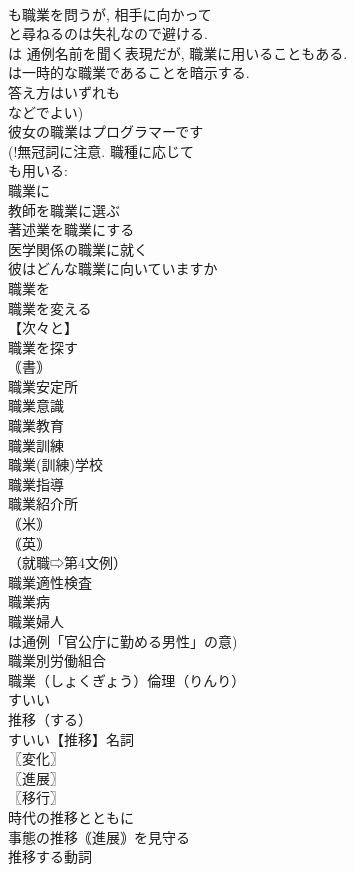 \documentclass[8pt]{extreport}
\begin{document}
\begin{CJK}{UTF8}{min}
\\	も職業を問うが, 相手に向かって 
\\	と尋ねるのは失礼なので避ける. 
\\	は 通例名前を聞く表現だが, 職業に用いることもある. 
\\	は一時的な職業であることを暗示する. 
\\	答え方はいずれも 
\\	などでよい)
\\	彼女の職業はプログラマーです
\\	(!無冠詞に注意. 職種に応じて 
\\	も用いる: 
\\	職業に
\\	教師を職業に選ぶ
\\	著述業を職業にする
\\	医学関係の職業に就く
\\	彼はどんな職業に向いていますか
\\	職業を
\\	職業を変える
\\	【次々と】
\\	職業を探す
\\	｟書｠
\\	職業安定所
\\	職業意識
\\	職業教育
\\	職業訓練
\\	職業(訓練)学校
\\	職業指導
\\	職業紹介所
\\	｟米｠
\\	｟英｠
\\	（就職⇨第4文例）
\\	職業適性検査
\\	職業病
\\	職業婦人
\\	は通例「官公庁に勤める男性」の意) 
\\	職業別労働組合
\\	職業（しょくぎょう）倫理（りんり）
\\	すいい
\\	推移（する）		
\\	すいい【推移】名詞
\\	〖変化〗
\\	〖進展〗
\\	〖移行〗
\\	時代の推移とともに
\\	事態の推移｟進展｠を見守る
\\	推移する動詞

\end{CJK}
\end{document}
